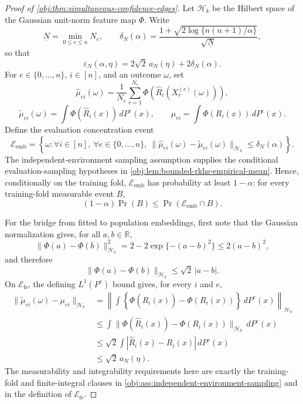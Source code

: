 \documentclass[11pt]{article}
\begin{document}
\begin{proof}[Proof of \cref{obj:thm:simultaneous-confidence-edges}]
Let \(\mathcal H_k\) be the Hilbert space of the Gaussian unit-norm feature map
\(\Phi\).  Write
\[
\underline N=\min_{0\le e\le n}N_e,
\qquad
\delta_N(\alpha)=
\frac{1+\sqrt{2\log\{n(n+1)/\alpha\}}}{\sqrt{\underline N}},
\]
so that
\[
\varepsilon_N(\alpha,\eta)
=
2\sqrt 2\,a_N(\eta)+2\delta_N(\alpha).
\]
For \(e\in\{0,\ldots,n\}\), \(i\in[n]\), and an outcome \(\omega\), set
\[
\widehat\mu_{e i}(\omega)
=
\frac1{N_e}\sum_{r=1}^{N_e}
\Phi\!\left(\widehat R_i(X^{(e)}_r(\omega))\right),
\]
\[
\widetilde\mu_{e i}(\omega)
=
\int \Phi\!\left(\widehat R_i(x)\right)\,dP^e(x),
\qquad
\mu_{e i}
=
\int \Phi\!\left(R_i(x)\right)\,dP^e(x).
\]
Define the evaluation concentration event
\[
\mathcal E_{\mathrm{emb}}
=
\left\{
\omega:
\forall i\in[n],\ \forall e\in\{0,\ldots,n\},\
\|\widehat\mu_{e i}(\omega)-\widetilde\mu_{e i}(\omega)\|_{\mathcal H_k}
\le \delta_N(\alpha)
\right\}.
\]
The independent-environment sampling assumption supplies the conditional evaluation-sampling hypotheses in \cref{obj:lem:bounded-rkhs-empirical-mean}.  Hence, conditionally on the training fold, \(\mathcal E_{\mathrm{emb}}\) has probability at least \(1-\alpha\): for every training-fold measurable event \(B\),
\[
(1-\alpha)\Pr(B)
\le
\Pr(\mathcal E_{\mathrm{emb}}\cap B).
\]

For the bridge from fitted to population embeddings, first note that the Gaussian normalization gives, for all \(a,b\in\mathbb R\),
\[
\|\Phi(a)-\Phi(b)\|_{\mathcal H_k}^2
=
2-2\exp\{-(a-b)^2\}
\le 2(a-b)^2,
\]
and therefore
\[
\|\Phi(a)-\Phi(b)\|_{\mathcal H_k}
\le
\sqrt2\,|a-b|.
\]
On \(\mathcal E_{\mathrm{fs}}\), the defining \(L^1(P^e)\) bound gives, for every \(i\) and \(e\),
\[
\begin{aligned}
\|\widetilde\mu_{e i}(\omega)-\mu_{e i}\|_{\mathcal H_k}
&=
\left\|
\int
\left\{
\Phi(\widehat R_i(x))-\Phi(R_i(x))
\right\}
\,dP^e(x)
\right\|_{\mathcal H_k}                                                   \\
&\le
\int
\|\Phi(\widehat R_i(x))-\Phi(R_i(x))\|_{\mathcal H_k}
\,dP^e(x)                                                                 \\
&\le
\sqrt2
\int
|\widehat R_i(x)-R_i(x)|
\,dP^e(x)                                                                 \\
&\le
\sqrt2\,a_N(\eta).
\end{aligned}
\]
The measurability and integrability requirements here are exactly the training-fold and finite-integral clauses in \cref{obj:ass:independent-environment-sampling} and in the definition of \(\mathcal E_{\mathrm{fs}}\).


\end{proof}
\end{document}
